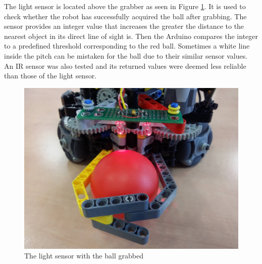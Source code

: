 \documentclass[a4paper,12pt]{article}
\begin{document}
The light sensor is located above the grabber as seen in Figure \ref{fig:sensor}. It is used to check whether
the robot has successfully acquired the ball after grabbing. The sensor
provides an integer value that increases the greater the distance to the
nearest object in its direct line of sight is. Then the Arduino compares the integer
to a predefined threshold corresponding to the red ball. Sometimes a white
line inside the pitch can be mistaken for the ball due to their similar sensor
values. An IR sensor was also tested and its returned values were deemed less reliable than
those of the light sensor.

\begin{figure}[ht!]
\centering
\includegraphics[scale=.1]{sensor1}
\caption{The light sensor with the ball grabbed}
\label{fig:sensor}
\end{figure}
\end{document}
